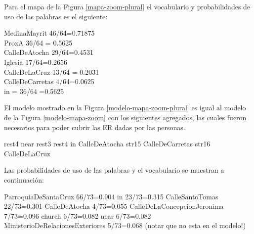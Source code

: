 Para el mapa de la Figura \ref{mapa-zoom-plural} el vocabulario y probabilidades de uso de las palabras es el siguiente:

MedinaMayrit 46/64=0.71875\\
ProxA 36/64 = 0.5625\\
CalleDeAtocha  29/64=0.4531\\
Iglesia 17/64=0.2656\\
CalleDeLaCruz 13/64 = 0.2031\\
CalleDeCarretas 4/64=0.0625\\
in = 36/64 =0.5625


El modelo mostrado en la Figura \ref{modelo-mapa-zoom-plural} es igual al modelo de la Figura \ref{modelo-mapa-zoom} con los siguientes agregados, las cuales fueron necesarios para poder cubrir las ER dadas por las personas.  

rest4 near rest3
rest4 in CalleDeAtocha
str15 CalleDeCarretas
str16 CalleDeLaCruz

Las probabilidades de uso de las palabras y el vocabulario se muestran a continuaci\'on:

ParroquiaDeSantaCruz 66/73=0.904
in 23/73=0.315
CalleSantoTomas 22/73=0.301
CalleDeAtocha 4/73=0.055
CalleDeLaConcepcionJeronima 7/73=0.096
church 6/73=0.082
near 6/73=0.082
MinisterioDeRelacionesExteriores 5/73=0.068 (notar que no esta en el modelo!)


